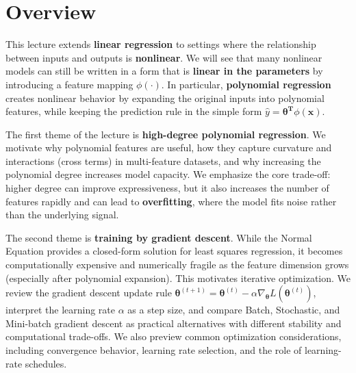 \documentclass{article}
\begin{document}

\section{Overview}

This lecture extends \textbf{linear regression} to settings where the relationship between inputs and outputs is \textbf{nonlinear}. We will see that many nonlinear models can still be written in a form that is \textbf{linear in the parameters} by introducing a feature mapping $\phi(\cdot)$. In particular, \textbf{polynomial regression} creates nonlinear behavior by expanding the original inputs into polynomial features, while keeping the prediction rule in the simple form $\hat{y}=\boldsymbol{\theta^T}\phi(\boldsymbol{x})$.

The first theme of the lecture is \textbf{high-degree polynomial regression}. We motivate why polynomial features are useful, how they capture curvature and interactions (cross terms) in multi-feature datasets, and why increasing the polynomial degree increases model capacity. We emphasize the core trade-off: higher degree can improve expressiveness, but it also increases the number of features rapidly and can lead to \textbf{overfitting}, where the model fits noise rather than the underlying signal.

The second theme is \textbf{training by gradient descent}. While the Normal Equation provides a closed-form solution for least squares regression, it becomes computationally expensive and numerically fragile as the feature dimension grows (especially after polynomial expansion). This motivates iterative optimization. We review the gradient descent update rule $\boldsymbol{\theta}^{(t+1)} = \boldsymbol{\theta}^{(t)} - \alpha \nabla_{\boldsymbol{\theta}} L(\boldsymbol{\theta}^{(t)})$, interpret the learning rate $\alpha$ as a step size, and compare Batch, Stochastic, and Mini-batch gradient descent as practical alternatives with different stability and computational trade-offs. We also preview common optimization considerations, including convergence behavior, learning rate selection, and the role of learning-rate schedules.
\end{document}
